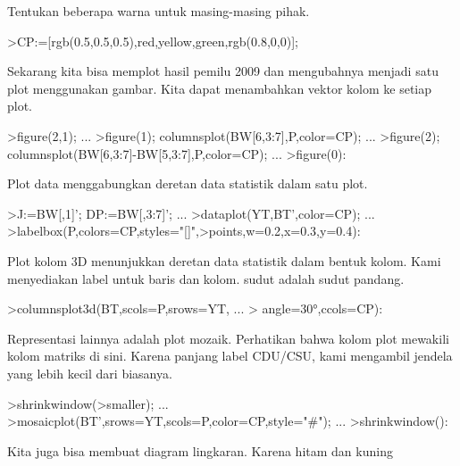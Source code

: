 \documentclass[a4paper,10pt]{article}
\begin{document}
\begin{eulernotebook}
\begin{eulercomment}
\begin{eulercomment}
\begin{eulercomment}
\begin{eulercomment}
\begin{eulercomment}
\begin{eulercomment}
\begin{eulercomment}
\begin{eulercomment}
\begin{eulercomment}
\begin{eulercomment}
\begin{eulercomment}
\begin{eulercomment}
\begin{eulercomment}
\begin{eulercomment}
\begin{eulercomment}
\begin{eulercomment}
\begin{eulercomment}
\begin{eulercomment}
\begin{eulercomment}
Tentukan beberapa warna untuk masing-masing pihak.
\end{eulercomment}
\begin{eulerprompt}
>CP:=[rgb(0.5,0.5,0.5),red,yellow,green,rgb(0.8,0,0)];
\end{eulerprompt}
\begin{eulercomment}
Sekarang kita bisa memplot hasil pemilu 2009 dan mengubahnya menjadi
satu plot menggunakan gambar. Kita dapat menambahkan vektor kolom ke
setiap plot.
\end{eulercomment}
\begin{eulerprompt}
>figure(2,1);  ...
>figure(1); columnsplot(BW[6,3:7],P,color=CP); ...
>figure(2); columnsplot(BW[6,3:7]-BW[5,3:7],P,color=CP);  ...
>figure(0):
\end{eulerprompt}
\begin{eulercomment}
Plot data menggabungkan deretan data statistik dalam satu plot.
\end{eulercomment}
\begin{eulerprompt}
>J:=BW[,1]'; DP:=BW[,3:7]'; ...
>dataplot(YT,BT',color=CP);  ...
>labelbox(P,colors=CP,styles="[]",>points,w=0.2,x=0.3,y=0.4):
\end{eulerprompt}
\begin{eulercomment}
Plot kolom 3D menunjukkan deretan data statistik dalam bentuk kolom.
Kami menyediakan label untuk baris dan kolom. sudut adalah sudut
pandang.
\end{eulercomment}
\begin{eulerprompt}
>columnsplot3d(BT,scols=P,srows=YT, ...
>  angle=30°,ccols=CP):
\end{eulerprompt}
\begin{eulercomment}
Representasi lainnya adalah plot mozaik. Perhatikan bahwa kolom plot
mewakili kolom matriks di sini. Karena panjang label CDU/CSU, kami
mengambil jendela yang lebih kecil dari biasanya.
\end{eulercomment}
\begin{eulerprompt}
>shrinkwindow(>smaller);  ...
>mosaicplot(BT',srows=YT,scols=P,color=CP,style="#"); ...
>shrinkwindow():
\end{eulerprompt}
\begin{eulercomment}
Kita juga bisa membuat diagram lingkaran. Karena hitam dan kuning

\end{eulercomment}
\end{eulercomment}
\end{eulercomment}
\end{eulercomment}
\end{eulercomment}
\end{eulercomment}
\end{eulercomment}
\end{eulercomment}
\end{eulercomment}
\end{eulercomment}
\end{eulercomment}
\end{eulercomment}
\end{eulercomment}
\end{eulercomment}
\end{eulercomment}
\end{eulercomment}
\end{eulercomment}
\end{eulercomment}
\end{eulercomment}
\end{eulernotebook}
\end{document}
